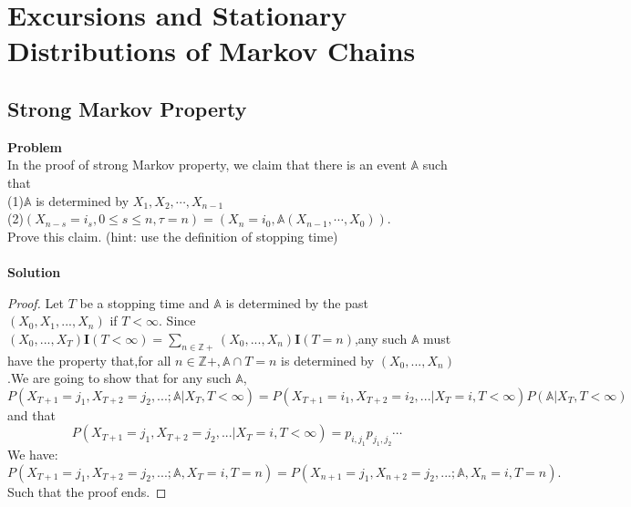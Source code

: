 \chapter{Excursions and Stationary Distributions of Markov
	Chains}
	
	\section{Strong Markov Property}
	\textbf{Problem}\\
	In the proof of strong Markov property, we claim that there is an event $\mathbb{A}$ such that\\
	(1)$\mathbb{A}$ is determined by $X_1,X_2,\cdots,X_{n-1}$\\
	(2)$(X_{n-s}=i_s,0 \leq s\leq n,\tau=n)=(X_n=i_0,\mathbb{A}(X_{n-1},\cdots,X_0))$.\\
	Prove this claim. (hint: use the definition of stopping time)\\\\
	\textbf{Solution}\\
	\begin{proof}
		Let $T$ be a stopping time and $\mathbb{A}$ is determined by the past $(X_0,X_1,...,X_n)$ if $T < \infty$. Since $(X_0,...,X_T) \mathbf{I} (T<\infty)=\sum_{n \in \mathbb{Z}+}^{}(X_0,...,X_n) \mathbf{I} (T=n)$,any such $\mathbb{A}$ must have the property that,for all $n\in \mathbb{Z}+,\mathbb{A} \cap {T=n}$ is determined by $(X_0,...,X_n)$.We are going to show that for any such $\mathbb{A}$,
		\[
		P(X_{T+1}=j_1,X_{T+2}=j_2,...;\mathbb{A}|X_T,T<\infty)=P(X_{T+1}=i_1,X_{T+2}=i_2,...|X_T=i,T<\infty)P(\mathbb{A}|X_T,T<\infty)
		\]
		and that
		\[
		P(X_{T+1}=j_1,X_{T+2}=j_2,...|X_T=i,T<\infty)=p_{i,j_1} p_{j_1,j_2}\cdots
		\]
		We have:
		\[
		P(X_{T+1}=j_1,X_{T+2}=j_2,...;\mathbb{A},X_T=i,T=n)=P(X_{n+1}=j_1,X_{n+2}=j_2,...;\mathbb{A},X_n=i,T=n).
		\]
		Such that the proof ends.
	\end{proof}
	
	

